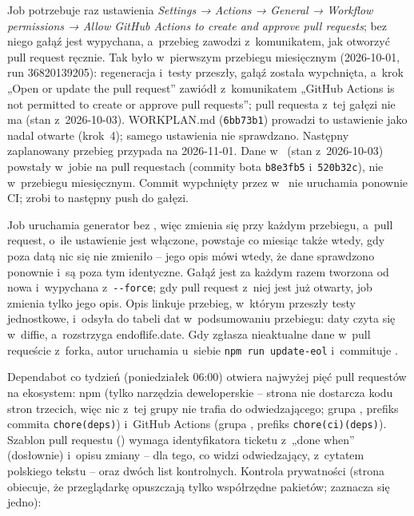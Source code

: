 Job  potrzebuje raz ustawienia \emph{Settings → Actions → General →
Workflow permissions → Allow GitHub Actions to create and approve pull requests}; bez niego
gałąź jest wypychana, a~przebieg zawodzi z~komunikatem, jak otworzyć pull request ręcznie.
Tak było w~pierwszym przebiegu miesięcznym (2026-10-01, run 36820139205): regeneracja
i~testy przeszły, gałąź  została wypchnięta, a~krok „Open or
update the pull request” zawiódł z~komunikatem „GitHub Actions is not permitted to create or
approve pull requests”; pull requesta z~tej gałęzi nie ma (stan z~2026-10-03). WORKPLAN.md
(\texttt{6bb73b1}) prowadzi to ustawienie jako nadal otwarte (krok~4); samego ustawienia nie
sprawdzano. Następny zaplanowany przebieg przypada na 2026-11-01. Dane
w~ (stan z~2026-10-03) powstały w~jobie  na pull
requestach (commity bota \texttt{b8e3fb5} i~\texttt{520b32c}), nie w~przebiegu miesięcznym.
Commit wypchnięty przez  w~ nie uruchamia ponownie
CI; zrobi to następny push do gałęzi.

Job  uruchamia generator bez , więc
 zmienia się przy każdym przebiegu, a~pull request, o~ile ustawienie
jest włączone, powstaje co miesiąc także wtedy, gdy poza datą nic się nie zmieniło -- jego opis mówi wtedy, że dane
sprawdzono ponownie i~są poza tym identyczne. Gałąź  jest
za każdym razem tworzona od nowa i~wypychana z~\texttt{-{}-force}; gdy pull request z~niej
jest już otwarty, job zmienia tylko jego opis. Opis linkuje przebieg, w~którym przeszły testy
jednostkowe, i~odsyła do tabeli dat w~podsumowaniu przebiegu: daty czyta się w~diffie,
a~rozstrzyga endoflife.date. Gdy  zgłasza nieaktualne dane w~pull
requeście z~forka, autor uruchamia u~siebie \texttt{npm run update-eol} i~commituje
.

Dependabot co tydzień (poniedziałek 06:00) otwiera najwyżej pięć pull requestów na
ekosystem: npm (tylko narzędzia deweloperskie -- strona nie dostarcza kodu stron trzecich,
więc nic z~tej grupy nie trafia do odwiedzającego; grupa , prefiks
commita \texttt{chore(deps)}) i~GitHub Actions (grupa , prefiks
\texttt{chore(ci)(deps)}). Szablon pull requestu
() wymaga identyfikatora ticketu z~„done when”
(dosłownie) i~opisu zmiany -- dla tego, co widzi odwiedzający, z~cytatem polskiego tekstu --
oraz dwóch list kontrolnych. Kontrola prywatności (strona obiecuje, że przeglądarkę opuszczają
tylko współrzędne pakietów; zaznacza się jedno):

